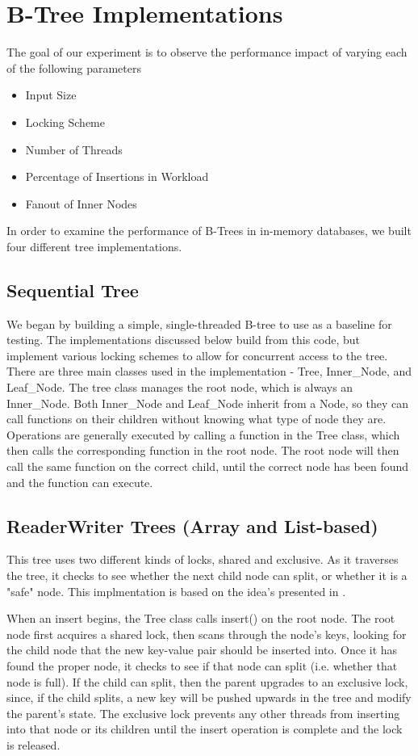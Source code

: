 \documentclass{sig-alternate}
\begin{document}
\section{B-Tree Implementations}
The goal of our experiment is to observe the performance impact of varying each of the following parameters 
\begin{itemize}
  \item Input Size
  \item Locking Scheme
  \item Number of Threads
  \item Percentage of Insertions in Workload
  \item Fanout of Inner Nodes
\end{itemize}
In order to examine the performance of B-Trees in in-memory databases, we built four different tree implementations.
\subsection{Sequential Tree}
We began by building a simple, single-threaded B-tree to use as a baseline for testing.  The implementations discussed below build from this code, but implement various locking schemes to allow for concurrent access to the tree. There are three main classes used in the implementation - Tree, Inner\_Node, and Leaf\_Node.  The tree class manages the root node, which is always an Inner\_Node.  Both Inner\_Node and Leaf\_Node inherit from a Node, so they can call functions on their children without knowing what type of node they are.  Operations are generally executed by calling a function in the Tree class, which then calls the corresponding function in the root node.  The root node will then call the same function on the correct child, until the correct node has been found and the function can execute.
\subsection{ReaderWriter Trees (Array and List-based)}
This tree uses two different kinds of locks, shared and exclusive. As it traverses the tree, it checks to see whether the next child node can split, or whether it is a "safe" node. This implmentation is based on the idea's presented in \cite{lehman:locking}.

When an insert begins, the Tree class calls insert() on the root node.  The root node first acquires a shared lock, then scans through the node's keys, looking for the child node that the new key-value pair should be inserted into.  Once it has found the proper node, it checks to see if that node can split (i.e. whether that node is full).  If the child can split, then the parent upgrades to an exclusive lock, since, if the child splits, a new key will be pushed upwards in the tree and modify the parent's state. The exclusive lock prevents any other threads from inserting into that node or its children until the insert operation is complete and the lock is released.
\end{document}
